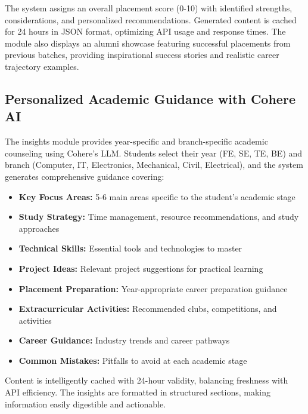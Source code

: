\documentclass[conference]{IEEEtran}
\begin{document}
The system assigns an overall placement score (0-10) with identified strengths, considerations, and personalized recommendations. Generated content is cached for 24 hours in JSON format, optimizing API usage and response times. The module also displays an alumni showcase featuring successful placements from previous batches, providing inspirational success stories and realistic career trajectory examples.

\subsection{Personalized Academic Guidance with Cohere AI}
The insights module provides year-specific and branch-specific academic counseling using Cohere's LLM. Students select their year (FE, SE, TE, BE) and branch (Computer, IT, Electronics, Mechanical, Civil, Electrical), and the system generates comprehensive guidance covering:
\begin{itemize}
    \item \textbf{Key Focus Areas:} 5-6 main areas specific to the student's academic stage
    \item \textbf{Study Strategy:} Time management, resource recommendations, and study approaches
    \item \textbf{Technical Skills:} Essential tools and technologies to master
    \item \textbf{Project Ideas:} Relevant project suggestions for practical learning
    \item \textbf{Placement Preparation:} Year-appropriate career preparation guidance
    \item \textbf{Extracurricular Activities:} Recommended clubs, competitions, and activities
    \item \textbf{Career Guidance:} Industry trends and career pathways
    \item \textbf{Common Mistakes:} Pitfalls to avoid at each academic stage
\end{itemize}

Content is intelligently cached with 24-hour validity, balancing freshness with API efficiency. The insights are formatted in structured sections, making information easily digestible and actionable.
\end{document}
